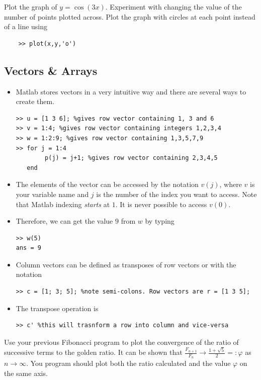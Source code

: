 \documentclass[12pt]{report}
\begin{document}
\begin{tcolorbox}[title=Task - Quick]
  Plot the graph of $y = \cos(3x)$. Experiment with changing the value of the number of points plotted across. Plot the graph with circles at each point instead of a line using
  \begin{lstlisting}
    >> plot(x,y,'o')
  \end{lstlisting}
\end{tcolorbox}

\subsection*{Vectors \& Arrays}
\begin{itemize}
\item Matlab stores vectors in a very intuitive way and there are several ways to create them.
\begin{lstlisting}
>> u = [1 3 6]; %gives row vector containing 1, 3 and 6
>> v = 1:4; %gives row vector containing integers 1,2,3,4
>> w = 1:2:9; %gives row vector containing 1,3,5,7,9
>> for j = 1:4
		p(j) = j+1; %gives row vector containing 2,3,4,5
   end
\end{lstlisting}
\item The elements of the vector can be accessed by the notation $v(j)$, where $v$ is your variable name and $j$ is the number of the index you want to access. Note that Matlab indexing \textit{starts} at $1$. It is never possible to access $v(0)$.
\item Therefore, we can get the value $9$ from $w$ by typing 
\begin{lstlisting}
>> w(5)
ans = 9
\end{lstlisting}
\item Column vectors can be defined as transposes of row vectors or with the notation
\begin{lstlisting}
>> c = [1; 3; 5]; %note semi-colons. Row vectors are r = [1 3 5];
\end{lstlisting}
\item The transpose operation is 
\begin{lstlisting}
>> c' %this will trasnform a row into column and vice-versa
\end{lstlisting}
\end{itemize}

\begin{tcolorbox}[title=Task]
  Use your previous Fibonacci program to plot the convergence of the ratio of successive terms to the golden ratio.
  \tcblower
  It can be shown that $\frac{F_{n+1}}{F_{n}} \to \frac{1 + \sqrt{5}}{2} =: \varphi$ as $n \to \infty$. You program should plot both the ratio calculated and the value $\varphi$ on the same axis.
\end{tcolorbox}
\end{document}
